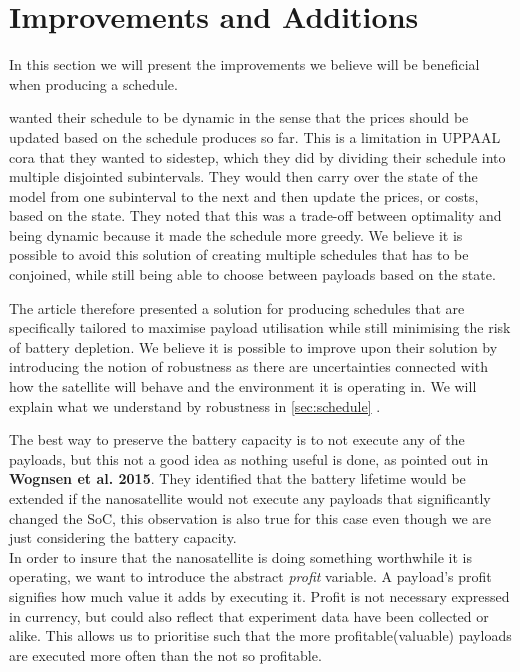 \section{Improvements and Additions}
In this section we will present the improvements we believe will be beneficial when producing a schedule. %
{}

\cite{gomx3} wanted their schedule to be dynamic in the sense that the prices should be updated based on the schedule produces so far. This is a limitation in UPPAAL \gls {cora} that they wanted to sidestep, which they did by dividing their schedule into multiple disjointed subintervals. They would then carry over the state of the model from one subinterval to the next and then update the prices, or costs, based on the state. They noted that this was a trade-off between optimality and being dynamic because it made the schedule more greedy. We believe it is possible to avoid this solution of creating multiple schedules that has to be conjoined, while still being able to choose between payloads based on the state. %

The article therefore presented a solution for producing schedules that are specifically tailored to maximise payload utilisation while still minimising the risk of battery depletion. We believe it is possible to improve upon their solution by introducing the notion of robustness as there are uncertainties connected with how the satellite will behave and the environment it is operating in. We will explain what we understand by robustness in \cref{sec:schedule} .

The best way to preserve the battery capacity is to not execute any of the payloads, but this not a good idea as nothing useful is done, as pointed out in \textbf{Wognsen et al. 2015}\cite{score_function}. They identified that the battery lifetime would be extended if the nanosatellite would not execute any payloads that significantly changed the SoC, this observation is also true for this case even though we are just considering the battery capacity.\\
In order to insure that the nanosatellite is doing something worthwhile it is operating, we want to introduce the abstract \textit{profit} variable. A payload's profit signifies how much value it adds by executing it. Profit is not necessary expressed in currency, but could also reflect that experiment data have been collected or alike. This allows us to prioritise such that the more profitable(valuable) payloads are executed more often than the not so profitable.

